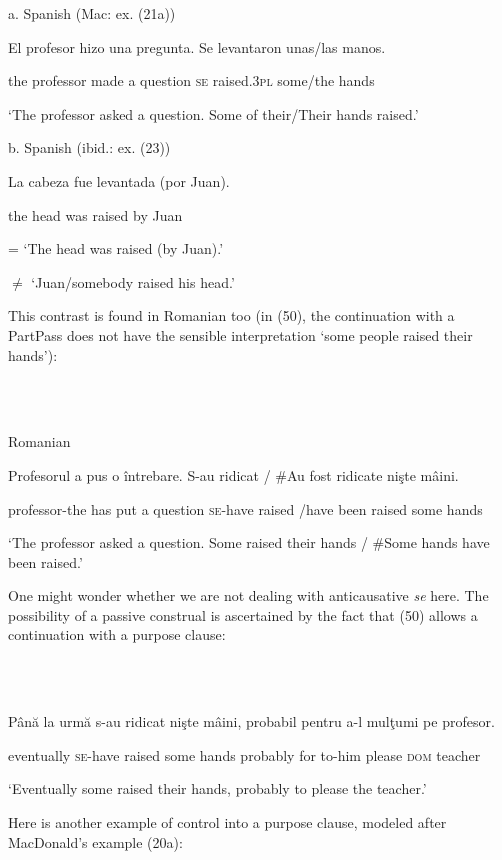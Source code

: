 \documentclass[output=paper]{langsci/langscibook}
\begin{document}
          a.   Spanish (Mac\citealt{Donald2017}: ex. (21a))

El   profesor   hizo   una pregunta. Se  levantaron unas/las   manos. 

        the professor  made a      question  \textsc{se}  raised.\textsc{3pl}  some/the hands         

        ‘The professor asked a question. Some of their/Their hands raised.’

  b.    Spanish (ibid.: ex. (23))

La cabeza fue levantada (por Juan).    

         the head   was raised        by  Juan

        = ‘The head was raised (by Juan).’

        ${\neq}$ ‘Juan/somebody raised his head.’

This contrast is found in Romanian too (in (50), the continuation with a PartPass does not have the sensible interpretation ‘some people raised their hands’):

\ea%
    \label{ex:key:50}
    \gll\\
        \\
    \glt
    \z

          Romanian

Profesorul      a   pus o întrebare. S-au     ridicat / \#Au   fost   ridicate nişte mâini.

  professor-the has put a question  \textsc{se-}have raised  /have  been raised   some hands

‘The professor asked a question. Some raised their hands / \#Some hands have been raised.’

One might wonder whether we are not dealing with anticausative \textit{se} here. The possibility of a passive construal is ascertained by the fact that (50) allows a continuation with a purpose clause:   

\ea%
    \label{ex:key:51}
    \gll\\
        \\
    \glt
    \z

          Până la urmă s-au     ridicat nişte mâini,  probabil  pentru a-l      mulţumi  pe   profesor.

eventually     \textsc{se}{}-have raised some hands probably for      to-him please    \textsc{dom} teacher

‘Eventually some raised their hands, probably to please the teacher.’

Here is another example of control into a purpose clause, modeled after MacDonald’s example (20a): 
\end{document}
